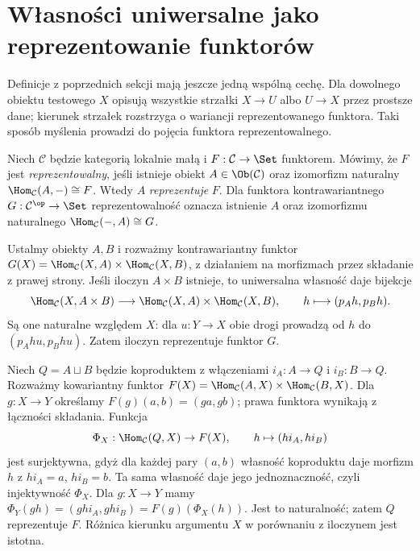 \section{Własności uniwersalne jako reprezentowanie funktorów}\label{sec:reprezentacja}

\providecommand{\atlasref}[2]{#2}

Definicje z poprzednich sekcji mają jeszcze jedną wspólną cechę. Dla dowolnego obiektu testowego $X$ opisują wszystkie strzałki $X\to U$ albo $U\to X$ przez prostsze dane; kierunek strzałek rozstrzyga o wariancji reprezentowanego funktora. Taki sposób myślenia prowadzi do pojęcia funktora reprezentowalnego.

\begin{definicja}[Reprezentowalność]\label{def:representable}
Niech $\mathcal C$ będzie kategorią lokalnie małą i $F:\mathcal C\to\Set$ funktorem. Mówimy, że $F$ jest \emph{reprezentowalny}, jeśli istnieje obiekt $A\in\Ob(\mathcal C)$ oraz izomorfizm naturalny $\Hom_{\mathcal C}(A,-)\cong F$. Wtedy $A$ \emph{reprezentuje} $F$. Dla funktora kontrawariantnego $G:\mathcal C^{\op}\to\Set$ reprezentowalność oznacza istnienie $A$ oraz izomorfizmu naturalnego $\Hom_{\mathcal C}(-,A)\cong G$.
\end{definicja}

\begin{przyklad}
Ustalmy obiekty $A,B$ i rozważmy kontrawariantny funktor $G(X)=\Hom_{\mathcal C}(X,A)\times\Hom_{\mathcal C}(X,B)$, z działaniem na morfizmach przez składanie z prawej strony. Jeśli iloczyn $A\times B$ istnieje, to uniwersalna własność daje bijekcje
\[
\Hom_{\mathcal C}(X,A\times B)\longrightarrow\Hom_{\mathcal C}(X,A)\times\Hom_{\mathcal C}(X,B),\qquad h\longmapsto(p_Ah,p_Bh).
\]
Są one naturalne względem $X$: dla $u:Y\to X$ obie drogi prowadzą od $h$ do $(p_Ahu,p_Bhu)$. Zatem iloczyn reprezentuje funktor $G$.
\end{przyklad}

\begin{przyklad}
Niech $Q=A\sqcup B$ będzie koproduktem z włączeniami $i_A:A\to Q$ i $i_B:B\to Q$. Rozważmy kowariantny funktor $F(X)=\Hom_{\mathcal C}(A,X)\times\Hom_{\mathcal C}(B,X)$. Dla $g:X\to Y$ określamy $F(g)(a,b)=(ga,gb)$; prawa funktora wynikają z łączności składania. Funkcja
\[
\Phi_X:\Hom_{\mathcal C}(Q,X)\to F(X),\qquad
h\mapsto(hi_A,hi_B)
\]
jest surjektywna, gdyż dla każdej pary $(a,b)$ własność koproduktu daje morfizm $h$ z $hi_A=a$, $hi_B=b$. Ta sama własność daje jego jednoznaczność, czyli injektywność $\Phi_X$. Dla $g:X\to Y$ mamy
$\Phi_Y(gh)=(ghi_A,ghi_B)=F(g)(\Phi_X(h))$.
Jest to naturalność; zatem $Q$ reprezentuje $F$. Różnica kierunku argumentu $X$ w porównaniu z iloczynem jest istotna.
\end{przyklad}

